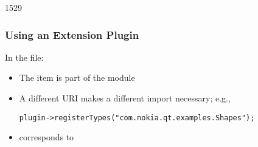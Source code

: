 \begin{slide}[fragile]{1529}\frametitle{Using an Extension Plugin}

In the  file:

\vspace*{0.5em}

\begin{itemize}
\item The  item is part of the  module
\item A different URI makes a different import necessary; e.g.,
\begin{lstlisting}
plugin->registerTypes("com.nokia.qt.examples.Shapes");
\end{lstlisting}
\item corresponds to\\
\begin{qml}
\\
\end{qml}
\end{itemize}

\end{slide}

